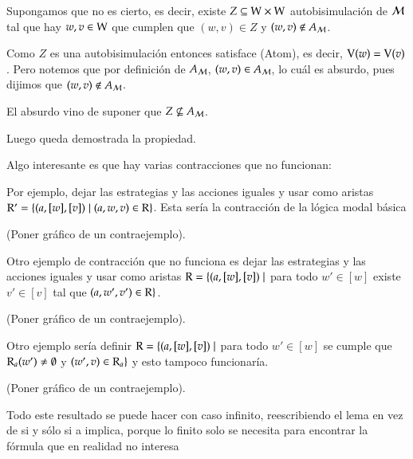 \begin{demostracion}
\begin{enumerate}
        Supongamos que no es cierto, es decir, existe $Z \subseteq \mathrm{W} \times \mathrm{W}$ autobisimulación de $\mathcal{M}$ tal que hay $w,v \in \mathrm{W}$ que cumplen que $(w,v) \in Z$ y $(w,v) \notin A_{\mathcal{M}}$. 

        Como $Z$ es una autobisimulación entonces satisface (Atom), es decir, $\mathrm{V}(w) = \mathrm{V}(v)$. Pero notemos que por definición de $A_{\mathcal{M}}$, $(w,v) \in A_{\mathcal{M}}$, lo cuál es absurdo, pues dijimos que $(w,v) \notin A_{\mathcal{M}}$.

        El absurdo vino de suponer que $Z \nsubseteq A_{\mathcal{M}}$.

        Luego queda demostrada la propiedad.

        
    \end{enumerate}
\end{demostracion}



Algo interesante es que hay varias contracciones que no funcionan:

Por ejemplo, dejar las estrategias y las acciones iguales y usar como aristas $\mathrm{R}' = \{(a,[w],[v]) \mid (a,w,v)\in \mathrm{R}\}$. Esta sería la contracción de la lógica modal básica

(Poner gráfico de un contraejemplo).

Otro ejemplo de contracción que no funciona es dejar las estrategias y las acciones iguales y usar como aristas $\mathrm{R} = \{(a,[w],[v]) \mid$ para todo $w' \in [w]$ existe $v' \in [v]$ tal que $(a,w',v') \in \mathrm{R}\}$.

(Poner gráfico de un contraejemplo).

Otro ejemplo sería definir $\mathrm{R} = \{(a,[w],[v]) \mid$ para todo $w' \in [w]$ se cumple que $\mathrm{R}_a(w') \neq \emptyset$ y $(w',v) \in \mathrm{R}_a \}$ y esto tampoco funcionaría.  

(Poner gráfico de un contraejemplo).

Todo este resultado se puede hacer con caso infinito, reescribiendo el lema en vez de si y sólo si a implica, porque lo finito solo se necesita para encontrar la fórmula que en realidad no interesa



